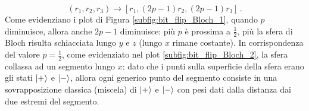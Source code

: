 \begin{esempio}
    \begin{equation*}
        (r_1,r_2,r_3) \rightarrow \left[ r_1, (2p-1)r_2, (2p-1)r_3 \right] \, .
    \end{equation*}
    Come evidenziano i plot di Figura \ref{subfig:bit_flip_Bloch_1}, quando $p$ diminuisce, allora anche $2p-1$ diminuisce: più $p$ è prossima a $\frac{1}{2}$, più la sfera di Bloch risulta schiacciata lungo $y$ e $z$ (lungo $x$ rimane costante). In corrispondenza del valore $p = \frac{1}{2}$, come evidenziato nel plot \ref{subfig:bit_flip_Bloch_2}, la sfera collassa ad un segmento lungo $x$: dato che i punti sulla superficie della sfera erano gli stati $\ket{+}$ e $\ket{-}$, allora ogni generico punto del segmento consiste in una sovrapposizione classica (miscela) di $\ket{+}$ e $\ket{-}$ con pesi dati dalla distanza dai due estremi del segmento.    
    

\end{esempio}
